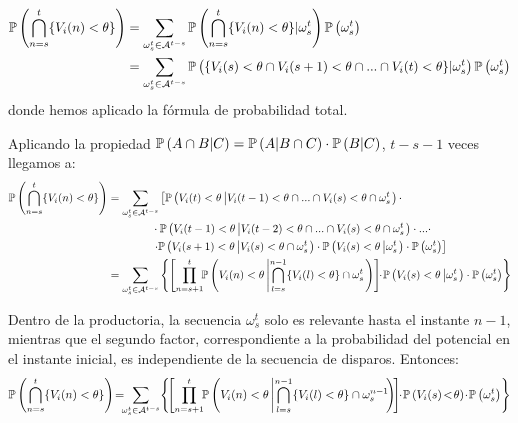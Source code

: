 \begin{align*}
    \mathbb{P}\left( \bigcap_{n=s}^t \{ V_i(n) < \theta \} \right) & =
    \sum_{\omega_s^t \in \mathcal{A}^{t-s}}
       \mathbb{P}\left( \bigcap_{n=s}^t \{ V_i(n) < \theta\} | \omega_s^t \right) \mathbb{P}\left(\omega_s^t\right)\\
     & =     \sum_{\omega_s^t \in \mathcal{A}^{t-s}}
       \mathbb{P}\left( \{ V_i(s) < \theta \cap  V_i(s+1) < \theta \cap... \cap V_i(t) < \theta \} | \omega_s^t \right) \mathbb{P}\left(\omega_s^t\right)
\end{align*}
donde hemos aplicado la fórmula de probabilidad total.

Aplicando la propiedad $\mathbb{P}\left(A \cap B | C\right) = \mathbb{P}\left(A | B \cap C\right)\cdot\mathbb{P}\left(B|C\right)$, $t-s-1$ veces llegamos a:
\begin{align*}
    \mathbb{P}\left( \bigcap_{n=s}^t \{ V_i(n) < \theta \} \right) & = 
    \sum_{\omega_s^t \in \mathcal{A}^{t-s}} \left[
       \mathbb{P}\left( V_i(t) < \theta \left| V_i(t-1) < \theta \cap... \cap V_i(s) < \theta \cap \omega_s^t \right.\right) \cdot \right.\\
       & \qquad \qquad \cdot \mathbb{P}\left( V_i(t-1) < \theta \left| V_i(t-2) < \theta \cap... \cap V_i(s) < \theta \cap \omega_s^t  \right.\right) \cdot ... \cdot \\
       & \left. \qquad \qquad \cdot \mathbb{P}\left( V_i(s+1) < \theta \left| V_i(s) < \theta \cap \omega_s^t \right.\right) \cdot \mathbb{P}\left( V_i(s) < \theta \left| \omega_s^t \right.\right) \cdot \mathbb{P}\left(\omega_s^t\right) \right] \\
       &= \sum_{\omega_s^t \in \mathcal{A}^{t-s}} \left\{ \left[ \prod_{n=s+1}^t \!\!
       \mathbb{P}\left( V_i(n) < \theta \left|  \bigcap_{l=s}^{n-1} \{ V_i(l) < \theta \} \cap \omega_s^t \right.\right) \right]\!\! \cdot \!\mathbb{P}\left( V_i(s) < \theta \left| \omega_s^t \right. \right) \cdot \mathbb{P}\left(\omega_s^t\right) \right\}
\end{align*}

Dentro de la productoria, la secuencia $\omega_s^t$ solo es relevante hasta el instante $n-1$, mientras que el segundo factor, correspondiente a la probabilidad del potencial en el instante inicial, es independiente de la secuencia de disparos. Entonces:
\begin{equation}
    \prob{ \bigcap_{n=s}^t \{ V_i(n) < \theta \} } \! = \!\!\!
    \sum_{\omega_s^t \in \mathcal{A}^{t-s}} \! \left\{ \! \left[ \prod_{n=s+1}^t  \!\!
      \prob{ V_i(n) < \theta \left|  \bigcap_{l=s}^{n-1} \{ V_i(l) < \theta \} \cap \omega_s^{n-1} \! \! \right. } \! \right] \!\! \cdot \! \prob{ V_i(s) \! < \! \theta } \! \cdot\! \prob{\omega_s^t} \right\}
    \label{eqn:probdisparo}
\end{equation}
    
